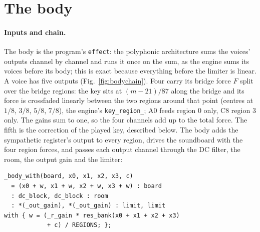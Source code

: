 \documentclass[10pt,a4paper,twocolumn]{article}
\newcommand{\code}[1]{\texttt{#1}}
\begin{document}
\section{The body}
\label{sec:body}

\paragraph{Inputs and chain.} The body is the program's \code{effect}: the polyphonic architecture sums the voices' outputs channel by channel and runs it once on the sum, as the engine sums its voices before its body; this is exact because everything before the limiter is linear. A voice has five outputs (Fig.~\ref{fig:bodychain}). Four carry its bridge force $F$ split over the bridge regions: the key sits at $(m-21)/87$ along the bridge and its force is crossfaded linearly between the two regions around that point (centres at $1/8$, $3/8$, $5/8$, $7/8$), the engine's \code{key\_region\_}; A0 feeds region 0 only, C8 region 3 only. The gains sum to one, so the four channels add up to the total force. The fifth is the correction of the played key, described below. The body adds the sympathetic register's output to every region, drives the soundboard with the four region forces, and passes each output channel through the DC filter, the room, the output gain and the limiter:
\begin{lstlisting}
_body_with(board, x0, x1, x2, x3, c)
  = (x0 + w, x1 + w, x2 + w, x3 + w) : board
  : dc_block, dc_block : room
  : *(_out_gain), *(_out_gain) : limit, limit
with { w = (_r_gain * res_bank(x0 + x1 + x2 + x3)
            + c) / REGIONS; };
\end{lstlisting}
\end{document}
